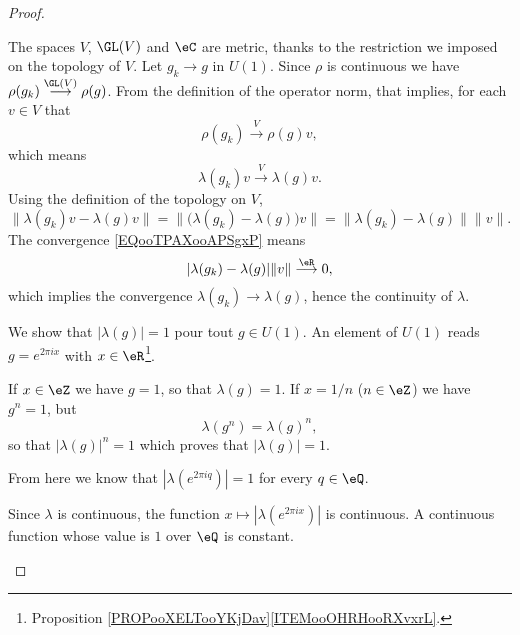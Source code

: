 \begin{proof}
\begin{subproof}
		The spaces \( V\), \( \GL(V)\) and \( \eC\) are metric, thanks to the restriction we imposed on the topology of \( V\). Let \( g_k\to g\) in \( U(1)\). Since \( \rho\) is continuous we have \( \rho(g_k)\stackrel{\GL(V)}{\longrightarrow}\rho(g)\). From the definition of the operator norm, that implies, for each \( v\in V\) that
		\begin{equation}
			\rho(g_k)\stackrel{V}{\longrightarrow}\rho(g)v,
		\end{equation}
		which means
		\begin{equation}        \label{EQooTPAXooAPSgxP}
			\lambda(g_k)v\stackrel{V}{\longrightarrow}\lambda(g)v.
		\end{equation}
		Using the definition of the topology on \( V\),
		\begin{equation}
			\| \lambda(g_k)v-\lambda(g)v \|=\|\big( \lambda(g_k)-\lambda(g) \big)v \|=\| \lambda(g_k)-\lambda(g) \|\| v \|.
		\end{equation}
		The convergence \eqref{EQooTPAXooAPSgxP} means
		\begin{equation}
			| \lambda(g_k)-\lambda(g) |\| v \|\stackrel{\eR}{\longrightarrow}0,
		\end{equation}
		which implies the convergence \( \lambda(g_k)\to \lambda(g)\), hence the continuity of \( \lambda\).


		We show that \( |\lambda(g)|=1\) pour tout \( g\in U(1)\). An element of \( U(1)\) reads \( g= e^{2\pi i x}\) with \( x\in \eR\)\footnote{Proposition \ref{PROPooXELTooYKjDav}\ref{ITEMooOHRHooRXvxrL}.}.

		If \( x\in \eZ\) we have \( g=1\), so that \( \lambda(g)=1\). If \( x=1/n\) (\( n\in \eZ\)) we have \( g^n=1\), but
		\begin{equation}
			\lambda(g^n)=\lambda(g)^n,
		\end{equation}
		so that \( | \lambda(g) |^n=1\) which proves that \( | \lambda(g) |=1\).

		From here we know that \( |\lambda( e^{2\pi i q})|=1\) for every \( q\in \eQ\).

		Since \( \lambda\) is continuous, the function \( x\mapsto | \lambda( e^{2\pi i x}) |\) is continuous. A continuous function whose value is \( 1\) over \( \eQ\) is constant.


\end{subproof}
\end{proof}
